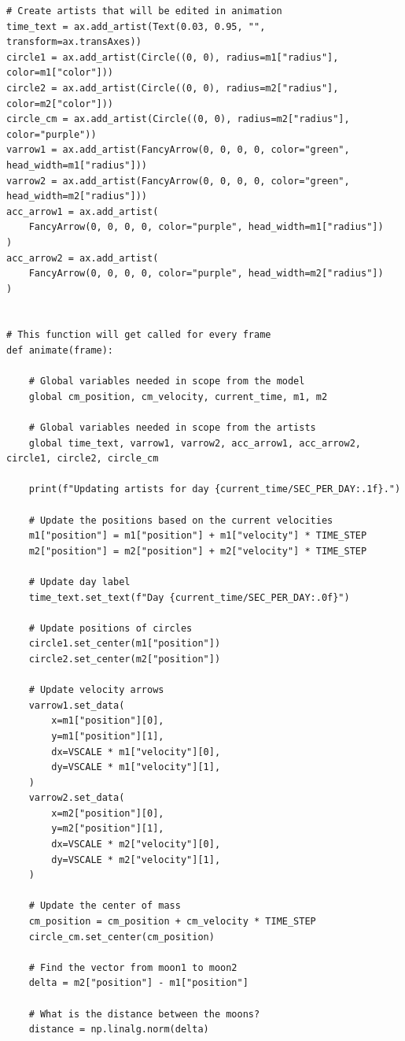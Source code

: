 \begin{verbatim}
# Create artists that will be edited in animation
time_text = ax.add_artist(Text(0.03, 0.95, "", transform=ax.transAxes))
circle1 = ax.add_artist(Circle((0, 0), radius=m1["radius"], color=m1["color"]))
circle2 = ax.add_artist(Circle((0, 0), radius=m2["radius"], color=m2["color"]))
circle_cm = ax.add_artist(Circle((0, 0), radius=m2["radius"], color="purple"))
varrow1 = ax.add_artist(FancyArrow(0, 0, 0, 0, color="green", head_width=m1["radius"]))
varrow2 = ax.add_artist(FancyArrow(0, 0, 0, 0, color="green", head_width=m2["radius"]))
acc_arrow1 = ax.add_artist(
    FancyArrow(0, 0, 0, 0, color="purple", head_width=m1["radius"])
)
acc_arrow2 = ax.add_artist(
    FancyArrow(0, 0, 0, 0, color="purple", head_width=m2["radius"])
)


# This function will get called for every frame
def animate(frame):

    # Global variables needed in scope from the model
    global cm_position, cm_velocity, current_time, m1, m2

    # Global variables needed in scope from the artists
    global time_text, varrow1, varrow2, acc_arrow1, acc_arrow2, circle1, circle2, circle_cm

    print(f"Updating artists for day {current_time/SEC_PER_DAY:.1f}.")

    # Update the positions based on the current velocities
    m1["position"] = m1["position"] + m1["velocity"] * TIME_STEP
    m2["position"] = m2["position"] + m2["velocity"] * TIME_STEP

    # Update day label
    time_text.set_text(f"Day {current_time/SEC_PER_DAY:.0f}")

    # Update positions of circles
    circle1.set_center(m1["position"])
    circle2.set_center(m2["position"])

    # Update velocity arrows
    varrow1.set_data(
        x=m1["position"][0],
        y=m1["position"][1],
        dx=VSCALE * m1["velocity"][0],
        dy=VSCALE * m1["velocity"][1],
    )
    varrow2.set_data(
        x=m2["position"][0],
        y=m2["position"][1],
        dx=VSCALE * m2["velocity"][0],
        dy=VSCALE * m2["velocity"][1],
    )

    # Update the center of mass
    cm_position = cm_position + cm_velocity * TIME_STEP
    circle_cm.set_center(cm_position)

    # Find the vector from moon1 to moon2
    delta = m2["position"] - m1["position"]

    # What is the distance between the moons?
    distance = np.linalg.norm(delta)


\end{verbatim}
